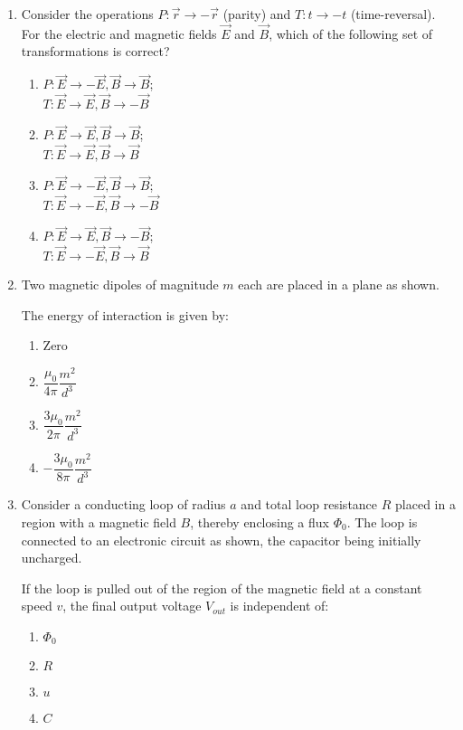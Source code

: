 \documentclass[journal]{IEEEtran}
\begin{document}
\begin{enumerate}[start=27]
\item Consider the operations $P: \vec{r} \rightarrow -\vec{r}$ (parity) and $T: t \rightarrow -t$ (time-reversal). For the electric and magnetic fields $\vec{E}$ and $\vec{B}$, which of the following set of transformations is correct?
\begin{multicols}{2}
\begin{enumerate}
\item $P: \vec{E} \to -\vec{E}, \vec{B} \to \vec{B}$;\\ $T: \vec{E} \to \vec{E}, \vec{B} \to -\vec{B}$
\item $P: \vec{E} \to \vec{E}, \vec{B} \to \vec{B}$;\\ $T: \vec{E} \to \vec{E}, \vec{B} \to \vec{B}$
\item $P: \vec{E} \to -\vec{E}, \vec{B} \to \vec{B}$;\\ $T: \vec{E} \to -\vec{E}, \vec{B} \to -\vec{B}$
\item $P: \vec{E} \to \vec{E}, \vec{B} \to -\vec{B}$; \\$T: \vec{E} \to -\vec{E}, \vec{B} \to \vec{B}$
\end{enumerate}
\end{multicols}

\item Two magnetic dipoles of magnitude $m$ each are placed in a plane as shown.


The energy of interaction is given by:
\begin{multicols}{2}
\begin{enumerate}
\item Zero
\item $\dfrac{\mu_0}{4\pi} \dfrac{m^2}{d^3}$
\item $\dfrac{3\mu_0}{2\pi} \dfrac{m^2}{d^3}$
\item $-\dfrac{3\mu_0}{8\pi} \dfrac{m^2}{d^3}$
\end{enumerate}
\end{multicols}

\item Consider a conducting loop of radius $a$ and total loop resistance $R$ placed in a region with a magnetic field $B$, thereby enclosing a flux $\Phi_0$. The loop is connected to an electronic circuit as shown, the capacitor being initially uncharged.


If the loop is pulled out of the region of the magnetic field at a constant speed $v$, the final output voltage $V_{out}$ is independent of:
\begin{multicols}{2}
\begin{enumerate}
 \item $\Phi_0$
 \item $R$
 \item $u$
 \item $C$
 \end{enumerate}
 \end{multicols}

 
 \end{enumerate}
\end{document}
